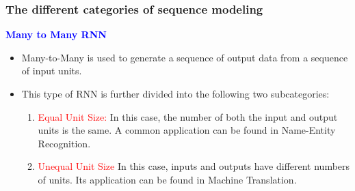\documentclass[11pt,]{beamer}
\begin{document}
\begin{frame}
	\frametitle{The different categories of sequence modeling}
	\large{\textcolor{blue}{\textbf{Many to Many RNN}}}
	\begin{itemize}
		\item Many-to-Many is used to generate a sequence of output data from a sequence of input units.
		\item This type of RNN is further divided into the following two subcategories:
		\begin{enumerate}
			\item \textcolor{red}{Equal Unit Size:} In this case, the number of both the input and output units is the same. A common application can be found in Name-Entity Recognition.
			\item \textcolor{red}{Unequal Unit Size} In this case, inputs and outputs have different numbers of units. Its application can be found in Machine Translation.
		\end{enumerate}
	\end{itemize}
	\par
	\hfill
	\par
\end{frame}
\end{document}
